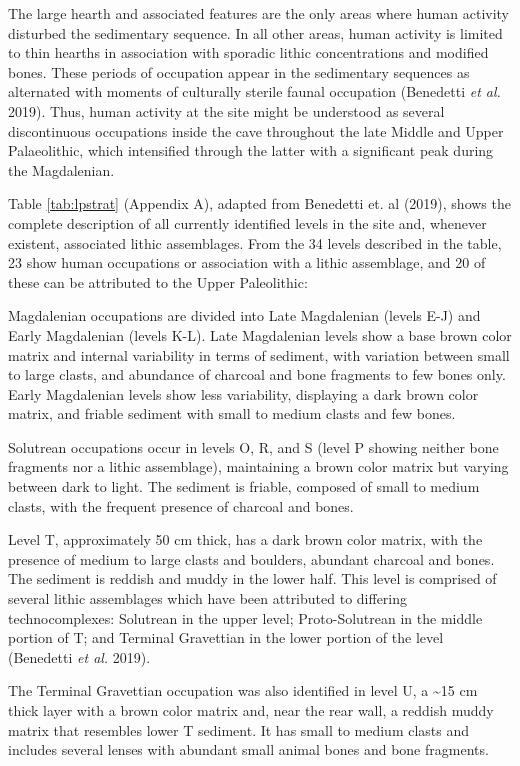 \documentclass[12pt,twoside]{reedthesis}
\begin{document}
The large hearth and associated features are the only areas where human activity disturbed the sedimentary sequence. In all other areas, human activity is limited to thin hearths in association with sporadic lithic concentrations and modified bones. These periods of occupation appear in the sedimentary sequences as alternated with moments of culturally sterile faunal occupation (Benedetti \emph{et al.} 2019). Thus, human activity at the site might be understood as several discontinuous occupations inside the cave throughout the late Middle and Upper Palaeolithic, which intensified through the latter with a significant peak during the Magdalenian.

Table \ref{tab:lpstrat} (Appendix A), adapted from Benedetti et. al (2019), shows the complete description of all currently identified levels in the site and, whenever existent, associated lithic assemblages. From the 34 levels described in the table, 23 show human occupations or association with a lithic assemblage, and 20 of these can be attributed to the Upper Paleolithic:

Magdalenian occupations are divided into Late Magdalenian (levels E-J) and Early Magdalenian (levels K-L). Late Magdalenian levels show a base brown color matrix and internal variability in terms of sediment, with variation between small to large clasts, and abundance of charcoal and bone fragments to few bones only. Early Magdalenian levels show less variability, displaying a dark brown color matrix, and friable sediment with small to medium clasts and few bones.

Solutrean occupations occur in levels O, R, and S (level P showing neither bone fragments nor a lithic assemblage), maintaining a brown color matrix but varying between dark to light. The sediment is friable, composed of small to medium clasts, with the frequent presence of charcoal and bones.

Level T, approximately 50 cm thick, has a dark brown color matrix, with the presence of medium to large clasts and boulders, abundant charcoal and bones. The sediment is reddish and muddy in the lower half. This level is comprised of several lithic assemblages which have been attributed to differing technocomplexes: Solutrean in the upper level; Proto-Solutrean in the middle portion of T; and Terminal Gravettian in the lower portion of the level (Benedetti \emph{et al.} 2019).

The Terminal Gravettian occupation was also identified in level U, a \textasciitilde15 cm thick layer with a brown color matrix and, near the rear wall, a reddish muddy matrix that resembles lower T sediment. It has small to medium clasts and includes several lenses with abundant small animal bones and bone fragments.
\end{document}
